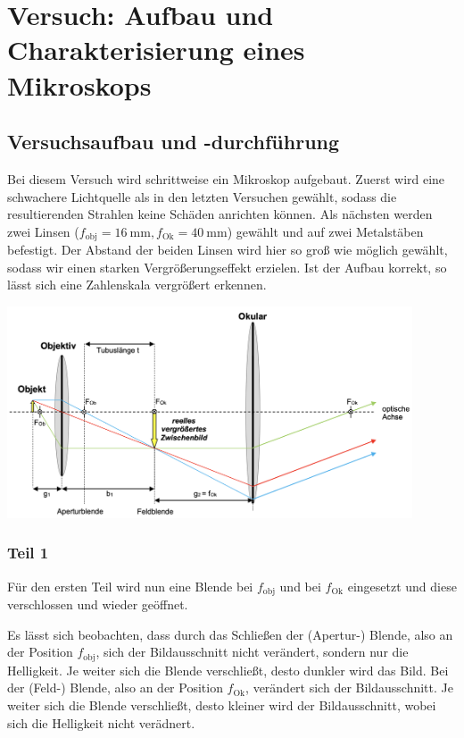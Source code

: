 \newpage

\section{Versuch: Aufbau und Charakterisierung eines Mikroskops}

    \subsection{Versuchsaufbau und -durchführung}

        Bei diesem Versuch wird schrittweise ein Mikroskop aufgebaut. Zuerst wird eine schwachere Lichtquelle als in den letzten Versuchen gewählt, sodass die resultierenden Strahlen keine Schäden anrichten können. Als nächsten werden zwei Linsen ($f_{\mathrm{obj}} = 16\ \mathrm{mm}, f_{\mathrm{Ok}} = 40\ \mathrm{mm}$) gewählt und auf zwei Metalstäben befestigt. Der Abstand der beiden Linsen wird hier so groß wie möglich gewählt, sodass wir einen starken Vergrößerungseffekt erzielen. Ist der Aufbau korrekt, so lässt sich eine Zahlenskala vergrößert erkennen.

        \begin{center}
            \includegraphics[width=0.9\textwidth]{skizze.png}
        \end{center}

        \subsubsection{Teil 1}
        
            Für den ersten Teil wird nun eine Blende bei $f_{\mathrm{obj}}$ und bei $f_{\mathrm{Ok}}$ eingesetzt und diese verschlossen und wieder geöffnet.

            Es lässt sich beobachten, dass durch das Schließen der (Apertur-) Blende, also an der Position $f_{\mathrm{obj}}$, sich der Bildausschnitt nicht verändert, sondern nur die Helligkeit. Je weiter sich die Blende verschließt, desto dunkler wird das Bild. Bei der (Feld-) Blende, also an der Position $f_{\mathrm{Ok}}$, verändert sich der Bildausschnitt. Je weiter sich die Blende verschließt, desto kleiner wird der Bildausschnitt, wobei sich die Helligkeit nicht verädnert.

